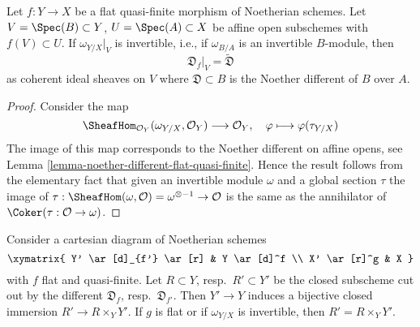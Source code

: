 \begin{lemma}
\label{lemma-flat-gorenstein-agree-noether}
Let $f : Y \to X$ be a flat quasi-finite morphism of Noetherian schemes.
Let $V = \Spec(B) \subset Y$, $U = \Spec(A) \subset X$
be affine open subschemes with $f(V) \subset U$.
If $\omega_{Y/X}|_V$ is invertible, i.e., if $\omega_{B/A}$
is an invertible $B$-module, then
$$
\mathfrak{D}_f|_V = \widetilde{\mathfrak{D}}
$$
as coherent ideal sheaves on $V$ where
$\mathfrak{D} \subset B$ is the Noether different of $B$ over $A$.
\end{lemma}

\begin{proof}
Consider the map
$$
\SheafHom_{\mathcal{O}_Y}(\omega_{Y/X}, \mathcal{O}_Y)
\longrightarrow
\mathcal{O}_Y,\quad
\varphi \longmapsto \varphi(\tau_{Y/X})
$$
The image of this map corresponds to the Noether different
on affine opens, see Lemma \ref{lemma-noether-different-flat-quasi-finite}.
Hence the result follows from the elementary fact that given
an invertible module $\omega$ and a global section $\tau$
the image of
$\tau : \SheafHom(\omega, \mathcal{O}) = \omega^{\otimes -1} \to \mathcal{O}$
is the same as the annihilator of $\Coker(\tau : \mathcal{O} \to \omega)$.
\end{proof}

\begin{lemma}
\label{lemma-base-change-different}
Consider a cartesian diagram of Noetherian schemes
$$
\xymatrix{
Y' \ar[d]_{f'} \ar[r] & Y \ar[d]^f \\
X' \ar[r]^g & X
}
$$
with $f$ flat and quasi-finite. Let $R \subset Y$, resp.\ $R' \subset Y'$
be the closed subscheme cut out by the different
$\mathfrak{D}_f$, resp.\ $\mathfrak{D}_{f'}$.
Then $Y' \to Y$ induces a bijective closed immersion $R' \to R \times_Y Y'$.
If $g$ is flat or if $\omega_{Y/X}$ is invertible, then
$R' = R \times_Y Y'$.
\end{lemma}


